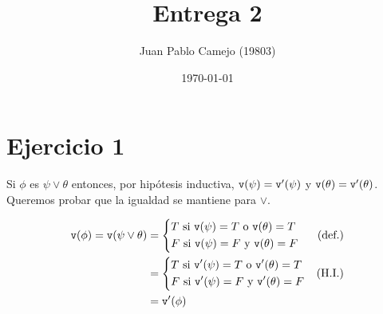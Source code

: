 \documentclass[a4paper,10pt]{article} %
\title{Entrega 2}
\author{Juan Pablo Camejo (19803)}
\date{\today}  %
\begin{document}
\maketitle   %

\section{Ejercicio 1}
Si $\phi$ es $\psi\lor\theta$ entonces, por hipótesis inductiva, 
$\verb|v|(\psi)=\verb|v|^\prime(\psi)$ y $\verb|v|(\theta)=\verb|v|^\prime(\theta)$.
Queremos probar que la igualdad se mantiene para $\lor$.

$$
\begin{aligned}
\verb|v|(\phi) = \verb|v|(\psi\lor\theta) 
            &= \left\{
                \begin{aligned}
                        & T \text{ si } \verb|v|(\psi)=T \text{ o } \verb|v|(\theta)=T\\
                        & F \text{ si } \verb|v|(\psi)=F \text{ y } \verb|v|(\theta)=F \\
                \end{aligned}
                \right. & \text{(def.)}\\
            &= \left\{
                \begin{aligned}
                        & T \text{ si } \verb|v|^\prime(\psi)=T \text{ o } \verb|v|^\prime(\theta)=T\\
                        & F \text{ si } \verb|v|^\prime(\psi)=F \text{ y } \verb|v|^\prime(\theta)=F \\
                \end{aligned}
                \right. & \text{(H.I.)}\\
            &= \verb|v|^\prime(\phi)
\end{aligned}
$$
\end{document}
